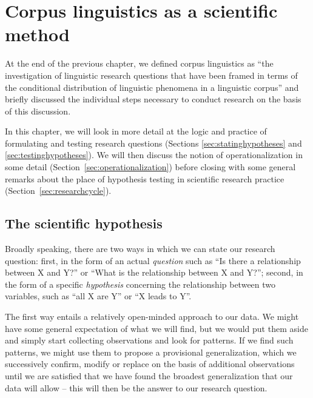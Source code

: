 \chapter{Corpus linguistics as a scientific method}
\label{ch:scientificmethod}

At the end of the previous chapter, we defined corpus linguistics as ``the investigation of linguistic research questions that have been framed in terms of the conditional distribution  of linguistic phenomena in a linguistic corpus'' and briefly discussed the individual steps necessary to conduct research on the basis of this discussion.

In this chapter, we will look in more detail at the logic and practice of formulating and testing research questions (Sections \ref{sec:statinghypotheses} and \ref{sec:testinghypotheses}). We will then discuss the notion of operationalization  in some detail (Section~\ref{sec:operationalization}) before closing with some general remarks about the place of hypothesis  testing in scientific research practice (Section~\ref{sec:researchcycle}).

\section{The scientific hypothesis}
\label{sec:scientifichypothesis}

Broadly speaking, there are two ways in which we can state our research question: first, in the form of an actual \emph{question} such as ``Is there a relationship between X and Y?'' or ``What is the relationship between X and Y?''; second, in the form of a specific \emph{hypothesis}  concerning the relationship between two variables, such as ``all X are Y'' or ``X leads to Y''.

The first way entails a relatively open\hyp{}minded approach to our data. We might have some general expectation of what we will find, but we would put them aside and simply start collecting observations  and look for patterns. If we find such patterns, we might use them to propose a provisional generalization, which we successively confirm, modify or replace on the basis of additional observations until we are satisfied that we have found the broadest generalization that our data will allow -- this will then be the answer to our research question.

